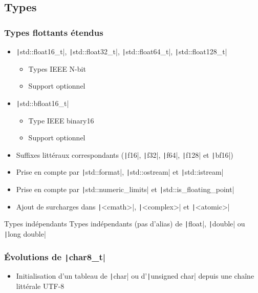 \documentclass[C++.tex]{subfiles}
\begin{document}
\subsection*{Types}
\begin{frame}[fragile]
	\frametitle{Types flottants étendus}
	\begin{itemize}
		\item \texttt|std::float16_t|, \texttt|std::float32_t|, \texttt|std::float64_t|, \texttt|std::float128_t|
		\begin{itemize}
			\item Types IEEE N-bit
			\item Support optionnel
		\end{itemize}
		\item \texttt|std::bfloat16_t|
		\begin{itemize}
			\item Type IEEE binary16
			\item Support optionnel
		\end{itemize}
		\item Suffixes littéraux correspondants (\texttt|f16|, \texttt|f32|, \texttt|f64|, \texttt|f128| et \texttt|bf16|)
		\item Prise en compte par \texttt|std::format|, \texttt|std::ostream| et \texttt|std::istream|
		\item Prise en compte par \texttt|std::numeric_limits| et \texttt|std::is_floating_point|
		\item Ajout de surcharges dans \texttt|<cmath>|, \texttt|<complex>| et \texttt|<atomic>|
	\end{itemize}

	\begin{alertblock}{Types indépendants}
		Types indépendants (pas d'alias) de \texttt|float|, \texttt|double| ou \texttt|long double|
	\end{alertblock}

\end{frame}

\begin{frame}[fragile]
	\frametitle{Évolutions de \texttt|char8_t|}
	\begin{itemize}
		\item Initialisation d'un tableau de \texttt|char| ou d'\texttt|unsigned char| depuis une chaîne littérale UTF-8
	\end{itemize}

\end{frame}
\end{document}
